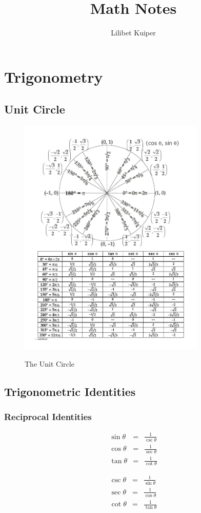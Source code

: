 \documentclass[a4paper,11pt]{book}
\title{Math Notes}
\author{Lilibet Kuiper}
\begin{document}
\maketitle
\tableofcontents

\chapter{Trigonometry}
\section{Unit Circle}

\begin{figure}[h!tb]
  \begin{center}
    \includegraphics[width=3.5in]{UnitCircleChart.jpg}
    \label{fig:UnitCircleCht}
    \caption{The Unit Circle}
  \end{center}
\end{figure}

\section{Trigonometric Identities}
\subsection{Reciprocal Identities}

\parbox{1.5in}{\begin{eqnarray*}
\sin\theta &=& \frac{1}{\csc\theta} \\
\cos\theta &=& \frac{1}{\sec\theta} \\
\tan\theta &=& \frac{1}{\cot\theta}
\end{eqnarray*}}
\hfill
\parbox{1.5in}{\begin{eqnarray*}
\csc\theta &=& \frac{1}{\sin\theta} \\
\sec\theta &=& \frac{1}{\cos\theta} \\
\cot\theta &=& \frac{1}{\tan\theta}
\end{eqnarray*}}
\end{document}
